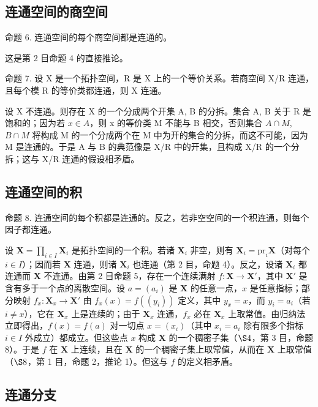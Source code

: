 \subsection{连通空间的商空间}

命题 6. 连通空间的每个商空间都是连通的。

这是第 2 目命题 4 的直接推论。

命题 7. 设 X 是一个拓扑空间，R 是 X 上的一个等价关系。若商空间 X/R 连通，且每个模 R 的等价类都连通，则 X 连通。

设 X 不连通。则存在 X 的一个分成两个开集 A, B 的分拆。集合 A, B 关于 R 是饱和的；因为若 \(x \in A\)，则 x 的等价类 M 不能与 B 相交，否则集合 \(A \cap M\), \(B \cap M\) 将构成 M 的一个分成两个在 M 中为开的集合的分拆，而这不可能，因为 M 是连通的。于是 A 与 B 的典范像是 X/R 中的开集，且构成 X/R 的一个分拆；这与 X/R 连通的假设相矛盾。

\subsection{连通空间的积}

命题 8. 连通空间的每个积都是连通的。反之，若非空空间的一个积连通，则每个因子都连通。

设 \(\mathbf{X} = \prod_{i \in I} \mathbf{X}_i\) 是拓扑空间的一个积。若诸 \(\mathbf{X}_i\) 非空，则有 \(\mathbf{X}_i = \text{pr}_i\mathbf{X}\)（对每个 \(i \in I\)）；因而若 \(\mathbf{X}\) 连通，则诸 \(\mathbf{X}_i\) 也连通（第 2 目，命题 4）。反之，设诸 \(\mathbf{X}_i\) 都连通而 \(\mathbf{X}\) 不连通。由第 2 目命题 5，存在一个连续满射 \(f: \mathbf{X} \to \mathbf{X}'\)，其中 \(\mathbf{X}'\) 是含有多于一个点的离散空间。设 \(a = (a_i)\) 是 \(\mathbf{X}\) 的任意一点，\(x\) 是任意指标；部分映射 \(f_x: \mathbf{X}_x \to \mathbf{X}'\) 由 \(f_x(x) = f((y_i))\) 定义，其中 \(y_x = x\)，而 \(y_i = a_i\)（若 \(i \neq x\)），它在 \(\mathbf{X}_x\) 上是连续的；由于 \(\mathbf{X}_x\) 连通，\(f_x\) 必在 \(\mathbf{X}_x\) 上取常值。由归纳法立即得出，\(f(x) = f(a)\) 对一切点 \(x = (x_i)\)（其中 \(x_i = a_i\) 除有限多个指标 \(i \in I\) 外成立）都成立。但这些点 \(x\) 构成 \(\mathbf{X}\) 的一个稠密子集（\(\S 4\)，第 3 目，命题 8）。于是 \(f\) 在 \(\mathbf{X}\) 上连续，且在 \(\mathbf{X}\) 的一个稠密子集上取常值，从而在 \(\mathbf{X}\) 上取常值（\(\S 8\)，第 1 目，命题 2，推论 1）。但这与 \(f\) 的定义相矛盾。

\subsection{连通分支}


